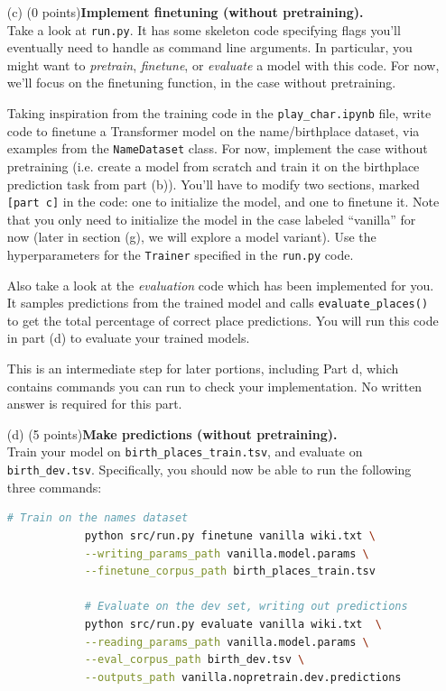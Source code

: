 \documentclass[letterpaper,12pt]{article}
\begin{document}
\begin{itemize}
	\item[(c)]
		(0 points)\textbf{Implement finetuning (without pretraining).}\\
		Take a look at \texttt{run.py}. It has some skeleton code specifying flags you'll eventually need to handle as command line arguments.
		In particular, you might want to \textit{pretrain}, \textit{finetune}, or \textit{evaluate} a model with this code. For now, we'll focus on the finetuning function, in the case without pretraining.
		
		Taking inspiration from the training code in the \texttt{play\_char.ipynb} file, write code to finetune a Transformer model on the name/birthplace dataset, via examples from the \texttt{NameDataset} class. For now, implement the case without pretraining (i.e. create a model from scratch and train it on the birthplace prediction task from part (b)). You'll have to modify two sections, marked \texttt{[part c]} in the code: one to initialize the model, and one to finetune it. Note that you only need to initialize the model in the case labeled ``vanilla'' for now (later in section (g), we will explore a model variant).
		Use the hyperparameters for the \texttt{Trainer} specified in the \texttt{run.py} code.
		
		Also take a look at the \textit{evaluation} code which has been implemented for you. It samples predictions from the trained model and calls \texttt{evaluate\_places()} to get the total percentage of correct place predictions. You will run this code in part (d) to evaluate your trained models.
		
		This is an intermediate step for later portions, including Part d, which contains commands you can run to check your implementation. No written answer is required for this part.
		
	\item[(d)]
		(5 points)\textbf{Make predictions (without pretraining).}\\ 
		Train your model on \texttt{birth\_places\_train.tsv}, and evaluate on \texttt{birth\_dev.tsv}. Specifically, you should now be able to run the following three commands:
		\begin{lstlisting}[language=bash, basicstyle=\small\ttfamily]
			# Train on the names dataset
			python src/run.py finetune vanilla wiki.txt \
			--writing_params_path vanilla.model.params \
			--finetune_corpus_path birth_places_train.tsv
			
			# Evaluate on the dev set, writing out predictions
			python src/run.py evaluate vanilla wiki.txt  \
			--reading_params_path vanilla.model.params \
			--eval_corpus_path birth_dev.tsv \
			--outputs_path vanilla.nopretrain.dev.predictions
			

\end{lstlisting}
\end{itemize}
\end{document}
